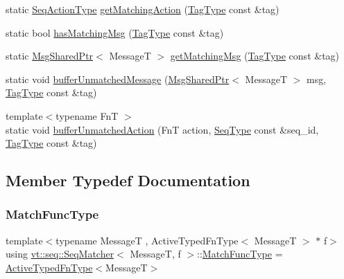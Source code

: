 \begin{DoxyCompactItemize}
\item 
static \hyperlink{structvt_1_1seq_1_1_seq_matcher_a180f9f54ad9d6d65893a36fe8b5b89e3}{Seq\+Action\+Type} \hyperlink{structvt_1_1seq_1_1_seq_matcher_ac6949485f86eb24ec9af508c636d3b9d}{get\+Matching\+Action} (\hyperlink{namespacevt_a84ab281dae04a52a4b243d6bf62d0e52}{Tag\+Type} const \&tag)
\item 
static bool \hyperlink{structvt_1_1seq_1_1_seq_matcher_aab83891cdc9b348a61bebfa481453bde}{has\+Matching\+Msg} (\hyperlink{namespacevt_a84ab281dae04a52a4b243d6bf62d0e52}{Tag\+Type} const \&tag)
\item 
static \hyperlink{namespacevt_ab2b3d506ec8e8d1540aede826d84a239}{Msg\+Shared\+Ptr}$<$ MessageT $>$ \hyperlink{structvt_1_1seq_1_1_seq_matcher_a457c1f447f1be51ecf3c480eca10366b}{get\+Matching\+Msg} (\hyperlink{namespacevt_a84ab281dae04a52a4b243d6bf62d0e52}{Tag\+Type} const \&tag)
\item 
static void \hyperlink{structvt_1_1seq_1_1_seq_matcher_a1dc8c34d3611f4eac7e21089e1484e52}{buffer\+Unmatched\+Message} (\hyperlink{namespacevt_ab2b3d506ec8e8d1540aede826d84a239}{Msg\+Shared\+Ptr}$<$ MessageT $>$ msg, \hyperlink{namespacevt_a84ab281dae04a52a4b243d6bf62d0e52}{Tag\+Type} const \&tag)
\item 
{\footnotesize template$<$typename FnT $>$ }\\static void \hyperlink{structvt_1_1seq_1_1_seq_matcher_aca3ab24ab457f57cd341c21aff0c0951}{buffer\+Unmatched\+Action} (FnT action, \hyperlink{namespacevt_1_1seq_a3b612da217ac669d39c159f134ab8434}{Seq\+Type} const \&seq\+\_\+id, \hyperlink{namespacevt_a84ab281dae04a52a4b243d6bf62d0e52}{Tag\+Type} const \&tag)
\end{DoxyCompactItemize}


\subsection{Member Typedef Documentation}
\mbox{\label{structvt_1_1seq_1_1_seq_matcher_a9b81f48a020c317f24cc13f4ec6295dc}} 
\subsubsection{\texorpdfstring{Match\+Func\+Type}{MatchFuncType}}
{\footnotesize\ttfamily template$<$typename MessageT , Active\+Typed\+Fn\+Type$<$ Message\+T $>$ $\ast$ f$>$ \\
using \hyperlink{structvt_1_1seq_1_1_seq_matcher}{vt\+::seq\+::\+Seq\+Matcher}$<$ MessageT, f $>$\+::\hyperlink{structvt_1_1seq_1_1_seq_matcher_a9b81f48a020c317f24cc13f4ec6295dc}{Match\+Func\+Type} =  \hyperlink{namespacevt_a54eefd5373739c7365058b0d22fea6e2}{Active\+Typed\+Fn\+Type}$<$MessageT$>$}

